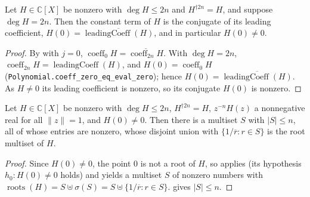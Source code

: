 \begin{lemma}
    \label{lem:fr-multiset-H0}
    \leanok
    Let $H \in \mathbb{C}[X]$ be nonzero with $\deg H \le 2n$ and
    $H^{\dagger 2n} = H$, and suppose $\deg H = 2n$. Then the constant term of
    $H$ is the conjugate of its leading coefficient, $H(0)
    = \overline{\operatorname{leadingCoeff}(H)}$, and in particular $H(0) \neq 0$.
\end{lemma}
\begin{proof}
    By  with $j = 0$,
    $\operatorname{coeff}_0 H = \overline{\operatorname{coeff}_{2n} H}$. With
    $\deg H = 2n$, $\operatorname{coeff}_{2n} H = \operatorname{leadingCoeff}(H)$,
    and $H(0) = \operatorname{coeff}_0 H$
    (\texttt{Polynomial.coeff\_zero\_eq\_eval\_zero}); hence $H(0)
    = \overline{\operatorname{leadingCoeff}(H)}$. As $H \neq 0$ its leading
    coefficient is nonzero, so its conjugate $H(0)$ is nonzero.
\end{proof}

\begin{lemma}
    \label{lem:fr-multiset}
    \leanok
    Let $H \in \mathbb{C}[X]$ be nonzero with $\deg H \le 2n$, $H^{\dagger 2n} = H$,
    $z^{-n}H(z)$ a nonnegative real for all $\|z\| = 1$, and $H(0) \neq 0$. Then
    there is a multiset $S$ with $|S| \le n$, all of whose entries are nonzero,
    whose disjoint union with $\{1/\overline{r} : r \in S\}$ is the root multiset
    of $H$.
\end{lemma}
\begin{proof}
    Since $H(0) \neq 0$, the point $0$ is not a root of $H$, so
     applies (its hypothesis $h_0 : H(0) \neq 0$ holds) and
    yields a multiset $S$ of nonzero numbers with
    $\operatorname{roots}(H) = S \uplus \sigma(S)
    = S \uplus \{1/\overline{r} : r \in S\}$.  gives
    $|S| \le n$.
\end{proof}

